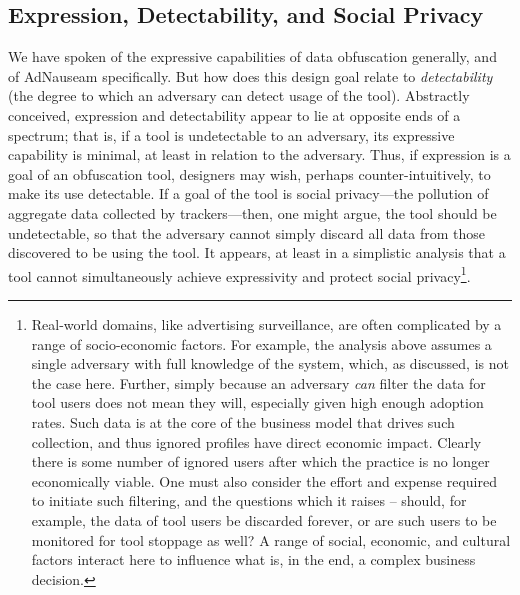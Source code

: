 \documentclass[conference]{IEEEtran}
\begin{document}

\subsection{Expression, Detectability, and Social Privacy}

We have spoken of the expressive capabilities of data obfuscation generally, and of AdNauseam specifically. But how does this design goal relate to \emph{detectability} (the degree to which an adversary can detect usage of the tool). Abstractly conceived, expression and detectability appear to lie at opposite ends of a spectrum; that is, if a tool is undetectable to an adversary, its expressive capability is minimal, at least in relation to the adversary. Thus, if expression is a goal of an obfuscation tool, designers may wish, perhaps counter-intuitively, to make its use detectable. If a goal of the tool is social privacy---the pollution of aggregate data collected by trackers---then, one might argue, the tool should be undetectable, so that the adversary cannot simply discard all data from those discovered to be using the tool. It appears, at least in a simplistic analysis that a tool cannot simultaneously achieve expressivity and protect social privacy\footnote{Real-world domains, like advertising surveillance, are often complicated by a range of socio-economic factors. For example, the analysis above assumes a single adversary with full knowledge of the system, which, as discussed, is not the case here. Further, simply because an adversary \emph{can} filter the data for tool users does not mean they will, especially given high enough adoption rates. Such data is at the core of the business model that drives such collection, and thus ignored profiles have direct economic impact. Clearly there is some number of ignored users after which the practice is no longer economically viable. One must also consider the effort and expense required to initiate such filtering, and the questions which it raises -- should, for example, the data of tool users be discarded forever, or are such users to be monitored for tool stoppage as well? A range of social, economic, and cultural factors interact here to influence what is, in the end, a complex business decision.}.
\end{document}
